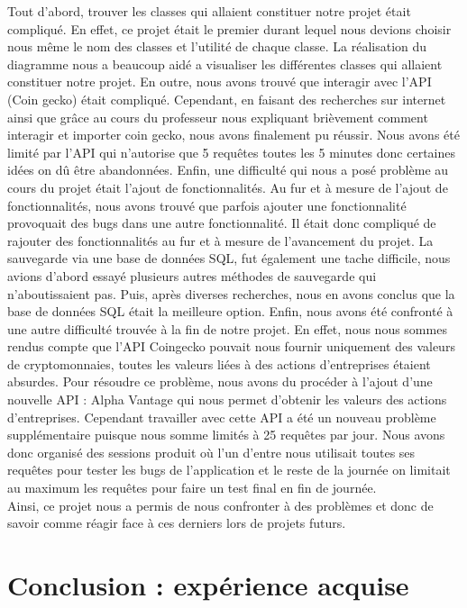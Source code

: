 \documentclass[12pt]{article}
\begin{document}
Tout d'abord, trouver les classes qui allaient constituer notre projet était compliqué. En effet, ce projet était le premier durant lequel nous devions choisir nous même le nom des classes et l'utilité de chaque classe. La réalisation du diagramme nous a beaucoup aidé a visualiser les différentes classes qui allaient constituer notre projet. En outre, nous avons trouvé que interagir avec l'API (Coin gecko) était compliqué. Cependant, en faisant des recherches sur internet ainsi que grâce au cours du professeur nous expliquant brièvement comment interagir et importer coin gecko, nous avons finalement pu réussir. Nous avons été limité par l'API qui n'autorise que 5 requêtes toutes les 5 minutes donc certaines idées on dû être abandonnées. Enfin, une difficulté qui nous a posé problème au cours du projet était l'ajout de fonctionnalités. Au fur et à mesure de l'ajout de fonctionnalités, nous avons trouvé que parfois ajouter une fonctionnalité provoquait des bugs dans une autre fonctionnalité. Il était donc compliqué de rajouter des fonctionnalités au fur et à mesure de l'avancement du projet. La sauvegarde via une base de données SQL, fut également une tache difficile, nous avions d'abord essayé plusieurs autres méthodes de sauvegarde qui n'aboutissaient pas. Puis, après diverses recherches, nous en avons conclus que la base de données SQL était la meilleure option. Enfin, nous avons été confronté à une autre difficulté trouvée à la fin de notre projet. En effet, nous nous sommes rendus compte que l'API Coingecko pouvait nous fournir uniquement des valeurs de cryptomonnaies, toutes les valeurs liées à des actions d'entreprises étaient absurdes. Pour résoudre ce problème, nous avons du procéder à l'ajout d'une nouvelle API : Alpha Vantage qui nous permet d'obtenir les valeurs des actions d'entreprises. Cependant travailler avec cette API a été un nouveau problème supplémentaire puisque nous somme limités à 25 requêtes par jour. Nous avons donc organisé des sessions produit où l'un d'entre nous utilisait toutes ses requêtes pour tester les bugs de l'application et le reste de la journée on limitait au maximum les requêtes pour faire un test final en fin de journée. \\

Ainsi, ce projet nous a permis de nous confronter à des problèmes et donc de savoir comme réagir face à ces derniers lors de projets futurs. 



\section{Conclusion : expérience acquise}
\end{document}
